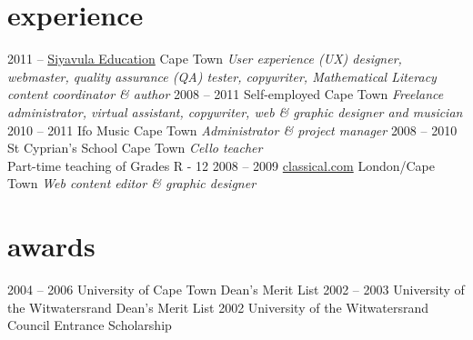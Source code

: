 \documentclass[]{friggeri-cv} %
\begin{document}

\section{experience}

\begin{entrylist}
\entry
{2011 --}
{\href{http://www.siyavula.com}{Siyavula Education}}
{Cape Town}
{\emph{User experience (UX) designer, webmaster, quality assurance (QA) tester, copywriter, Mathematical Literacy content coordinator \& author}}
\entry
{2008 -- 2011}
{Self-employed}
{Cape Town}
{\emph{Freelance administrator, virtual assistant, copywriter, web \& graphic designer and musician}}
\entry
{2010 -- 2011}
{Ifo Music}
{Cape Town}
{\emph{Administrator \& project manager}}
\entry
{2008 -- 2010}
{St Cyprian's School}
{Cape Town}
{\emph{Cello teacher} \\
Part-time teaching of Grades R - 12}
\entry
{2008 -- 2009}
{\href{http://www.classical.com}{classical.com}}
{London/Cape Town}
{\emph{Web content editor \& graphic designer}}

\end{entrylist}


\section{awards}

\begin{entrylist}
\entry
{2004 -- 2006}
{University of Cape Town Dean's Merit List}
{}
{}
\entry
{2002 -- 2003}
{University of the Witwatersrand Dean's Merit List}
{}
{}
\entry
{2002}
{University of the Witwatersrand Council Entrance Scholarship}
{}
{}
\end{entrylist}
\end{document}
